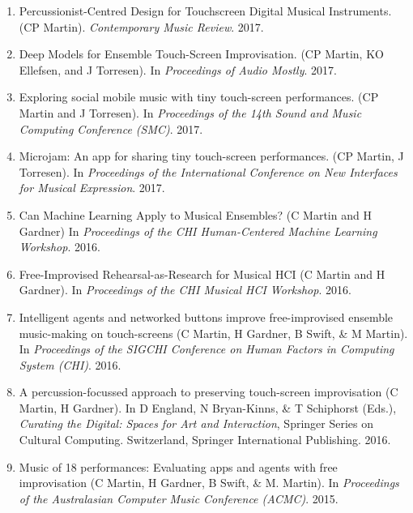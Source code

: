 \documentclass[11pt, a4paper, oneside]{article}
\begin{document}
\begin{enumerate}
\item Percussionist-Centred Design for Touchscreen Digital Musical
  Instruments. (CP Martin). \emph{Contemporary Music Review}. 2017.

\item Deep Models for Ensemble Touch-Screen Improvisation.
  (CP Martin, KO Ellefsen, and J Torresen). In
  \emph{Proceedings of Audio Mostly}. 2017.

\item Exploring social mobile music with tiny touch-screen
    performances. (CP Martin and J Torresen).  In
  \emph{Proceedings of the 14th Sound and Music Computing Conference
    (SMC)}. 2017. 

\item Microjam: An app for sharing tiny touch-screen
    performances. (CP Martin, J Torresen). In \emph{Proceedings
    of the International Conference on New Interfaces for Musical
    Expression}. 2017. 

\item Can Machine Learning Apply to Musical Ensembles? (C Martin and
  H Gardner) In \emph{Proceedings of the CHI Human-Centered Machine
    Learning Workshop}. 2016. 

\item Free-Improvised Rehearsal-as-Research for Musical HCI (C Martin and H Gardner). In
  \emph{Proceedings of the CHI Musical HCI Workshop}. 2016.

\item Intelligent agents and networked buttons improve
    free-improvised ensemble music-making on touch-screens (C
  Martin, H Gardner, B Swift, \& M Martin). In \emph{Proceedings of
    the SIGCHI Conference on Human Factors in Computing System (CHI)}.
    2016. 

\item A percussion-focussed approach to preserving touch-screen
    improvisation (C Martin, H Gardner). In D England, N
  Bryan-Kinns, \& T Schiphorst (Eds.), \emph{Curating the Digital: Spaces
  for Art and Interaction}, Springer Series on Cultural Computing.
  Switzerland, Springer International Publishing. 2016.

\item Music of 18 performances: Evaluating apps and agents with
    free improvisation (C Martin, H Gardner, B Swift, \& M.
  Martin). In \emph{Proceedings of the Australasian Computer Music
    Conference (ACMC)}. 2015. 


\end{enumerate}
\end{document}
